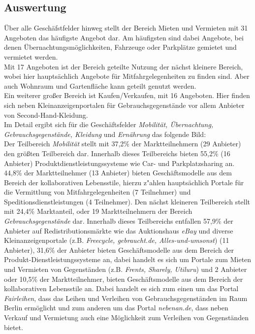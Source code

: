 \documentclass[a4paper]{scrartcl}
\begin{document}
\begin{multicols}{2}
		\subsection{Auswertung}
			\"Uber alle Gesch\"afstfelder hinweg stellt der Bereich {\glqq Mieten und Vermieten\grqq} mit 31 Angeboten das h\"aufigste Angebot dar. Am h\"aufigsten sind dabei Angebote, bei denen \"Ubernachtungsm\"oglichkeiten, Fahrzeuge oder Parkpl\"atze gemietet und vermietet werden.\\
			\noindent
			Mit 17 Angeboten ist der Bereich {\glqq geteilte Nutzung\grqq} der n\"achst kleinere Bereich, wobei hier haupts\"achlich Angebote f\"ur Mitfahrgelegenheiten zu finden sind. Aber auch Wohnraum und Gartenfl\"ache kann geteilt genutzt werden.\\
			\noindent
			Ein weiterer gro\ss er Bereich ist \glqq Kaufen/Verkaufen\grqq, mit 16 Angeboten. Hier finden sich neben Kleinanzeigenportalen f\"ur Gebrauchsgegenst\"ande vor allem Anbieter von Second-Hand-Kleidung.\\
			\noindent
			Im Detail ergibt sich f\"ur die Gesch\"aftsfelder \textit{Mobilit\"at, \"Ubernachtung, Gebrauchsgegenst\"ande, Kleidung} und \textit{Ern\"ahrung} das folgende Bild:\\ 
			\noindent
			Der Teilbereich \textit{Mobilit\"at} stellt mit 37,2\% der Marktteilnehmern (29 Anbieter)  den gr\"o\ss ten Teilbereich dar. Innerhalb dieses Teilbereichs bieten 55,2\% (16 Anbieter)   Produktdienstleistungssysteme wie Car- und Parkplatzsharing an. 44,8\% der Marktteilnehmer (13 Anbieter) bieten Gesch\"aftsmodelle aus dem Bereich der kollaborativen Lebensstile, hierzu z"ahlen haupts\"achlich Portale für die Vermittlung von Mitfahrgelegenheiten (7 Teilnehmer) und Speditionsdienstleistungen (4 Teilnehmer).\newline
			\noindent
			Den n\"achst kleineren Teilbereich stellt mit 24,4\% Marktanteil, oder 19 Marktteilnehmern der Bereich \textit{Gebrauchsgegenst\"ande} dar. Innerhalb dieses Teilbereichs entfallen 57,9\%  der Anbieter auf Redistributionsm\"arkte wie das Auktionshaus \textit{eBay} und diverse Kleinanzeigenportale (z.B. \textit{Freecycle, gebraucht.de, Alles-und-umsonst}) (11 Anbieter), 31,6\% der Anbieter bieten Gesch\"aftsmodelle aus dem Bereich der Produkt-Dienstleistungssysteme an, dabei handelt es sich um Portale zum Mieten und Vermieten von Gegenst\"anden (z.B. \textit{Frents, Sharely, Utiluru}) und 2 Anbieter oder 10,5\% der Marktteilnehmer, bieten Gesch\"aftsmodelle aus dem Bereich der kollaborativen Lebensstile an. Dabei handelt es sich zum einen um das Portal \textit{Fairleihen}, dass das Leihen und Verleihen von Gebrauchsgegenst\"anden im Raum Berlin erm\"oglicht und zum anderen um das Portal \textit{nebenan.de}, dass neben Verkauf und Vermietung auch eine M\"oglichkeit zum Verleihen von Gegenst\"anden bietet. \newline

\end{multicols}
\end{document}
